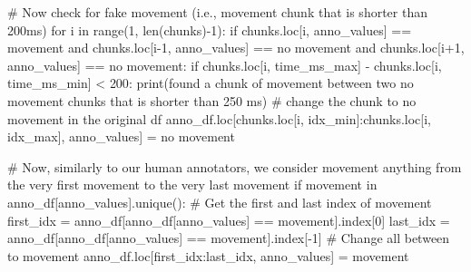 \documentclass[
  letterpaper,
  DIV=11,
  numbers=noendperiod]{scrreprt}
\newenvironment{Shaded}{\begin{snugshade}}{\end{snugshade}}
\newcommand{\BuiltInTok}[1]{\textcolor[rgb]{0.00,0.23,0.31}{#1}}
\newcommand{\CommentTok}[1]{\textcolor[rgb]{0.37,0.37,0.37}{#1}}
\newcommand{\ControlFlowTok}[1]{\textcolor[rgb]{0.00,0.23,0.31}{#1}}
\newcommand{\DecValTok}[1]{\textcolor[rgb]{0.68,0.00,0.00}{#1}}
\newcommand{\KeywordTok}[1]{\textcolor[rgb]{0.00,0.23,0.31}{#1}}
\newcommand{\NormalTok}[1]{\textcolor[rgb]{0.00,0.23,0.31}{#1}}
\newcommand{\OperatorTok}[1]{\textcolor[rgb]{0.37,0.37,0.37}{#1}}
\newcommand{\StringTok}[1]{\textcolor[rgb]{0.13,0.47,0.30}{#1}}
\begin{document}
\begin{Shaded}
\begin{Highlighting}[]
        \CommentTok{\# Now check for fake movement (i.e., movement chunk that is shorter than 200ms)}
        \ControlFlowTok{for}\NormalTok{ i }\KeywordTok{in} \BuiltInTok{range}\NormalTok{(}\DecValTok{1}\NormalTok{, }\BuiltInTok{len}\NormalTok{(chunks)}\OperatorTok{{-}}\DecValTok{1}\NormalTok{):}
            \ControlFlowTok{if}\NormalTok{ chunks.loc[i, }\StringTok{\textquotesingle{}anno\_values\textquotesingle{}}\NormalTok{] }\OperatorTok{==} \StringTok{\textquotesingle{}movement\textquotesingle{}} \KeywordTok{and}\NormalTok{ chunks.loc[i}\OperatorTok{{-}}\DecValTok{1}\NormalTok{, }\StringTok{\textquotesingle{}anno\_values\textquotesingle{}}\NormalTok{] }\OperatorTok{==} \StringTok{\textquotesingle{}no movement\textquotesingle{}} \KeywordTok{and}\NormalTok{ chunks.loc[i}\OperatorTok{+}\DecValTok{1}\NormalTok{, }\StringTok{\textquotesingle{}anno\_values\textquotesingle{}}\NormalTok{] }\OperatorTok{==} \StringTok{\textquotesingle{}no movement\textquotesingle{}}\NormalTok{:}
                \ControlFlowTok{if}\NormalTok{ chunks.loc[i, }\StringTok{\textquotesingle{}time\_ms\_max\textquotesingle{}}\NormalTok{] }\OperatorTok{{-}}\NormalTok{ chunks.loc[i, }\StringTok{\textquotesingle{}time\_ms\_min\textquotesingle{}}\NormalTok{] }\OperatorTok{\textless{}} \DecValTok{200}\NormalTok{:}
                    \BuiltInTok{print}\NormalTok{(}\StringTok{\textquotesingle{}found a chunk of movement between two no movement chunks that is shorter than 250 ms\textquotesingle{}}\NormalTok{)}
                    \CommentTok{\# change the chunk to no movement in the original df}
\NormalTok{                    anno\_df.loc[chunks.loc[i, }\StringTok{\textquotesingle{}idx\_min\textquotesingle{}}\NormalTok{]:chunks.loc[i, }\StringTok{\textquotesingle{}idx\_max\textquotesingle{}}\NormalTok{], }\StringTok{\textquotesingle{}anno\_values\textquotesingle{}}\NormalTok{] }\OperatorTok{=} \StringTok{\textquotesingle{}no movement\textquotesingle{}}

        
        \CommentTok{\# Now, similarly to our human annotators, we consider movement anything from the very first movement to the very last movement}
        \ControlFlowTok{if} \StringTok{\textquotesingle{}movement\textquotesingle{}} \KeywordTok{in}\NormalTok{ anno\_df[}\StringTok{\textquotesingle{}anno\_values\textquotesingle{}}\NormalTok{].unique():}
            \CommentTok{\# Get the first and last index of movement}
\NormalTok{            first\_idx }\OperatorTok{=}\NormalTok{ anno\_df[anno\_df[}\StringTok{\textquotesingle{}anno\_values\textquotesingle{}}\NormalTok{] }\OperatorTok{==} \StringTok{\textquotesingle{}movement\textquotesingle{}}\NormalTok{].index[}\DecValTok{0}\NormalTok{]}
\NormalTok{            last\_idx }\OperatorTok{=}\NormalTok{ anno\_df[anno\_df[}\StringTok{\textquotesingle{}anno\_values\textquotesingle{}}\NormalTok{] }\OperatorTok{==} \StringTok{\textquotesingle{}movement\textquotesingle{}}\NormalTok{].index[}\OperatorTok{{-}}\DecValTok{1}\NormalTok{]}
            \CommentTok{\# Change all between to movement}
\NormalTok{            anno\_df.loc[first\_idx:last\_idx, }\StringTok{\textquotesingle{}anno\_values\textquotesingle{}}\NormalTok{] }\OperatorTok{=} \StringTok{\textquotesingle{}movement\textquotesingle{}}


\end{Highlighting}
\end{Shaded}
\end{document}
